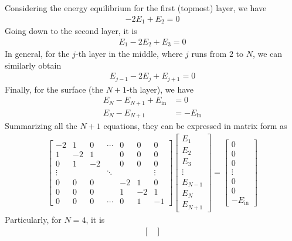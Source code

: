 \begin{solution}
Considering the energy equilibrium for the first (topmost) layer, we have
\begin{align*}
-2E_1 + E_2 = 0 
\end{align*}
Going down to the second layer, it is
\begin{align*}
E_1 - 2E_2 + E_3 = 0
\end{align*}
In general, for the $j$-th layer in the middle, where $j$ runs from $2$ to $N$, we can similarly obtain
\begin{align}
E_{j-1} - 2E_j + E_{j+1} = 0
\end{align}
Finally, for the surface (the $N+1$-th layer), we have
\begin{align*}
E_N - E_{N+1} + E_{\text{in}}  &= 0 \\
E_N - E_{N+1} &= -E_{\text{in}}  
\end{align*}
Summarizing all the $N+1$ equations, they can be expressed in matrix form as
\begin{align*}
\begin{bmatrix}
-2 & 1 & 0 & \cdots & 0 & 0 & 0 \\
1 & -2 & 1 & & 0 & 0 & 0 \\
0 & 1 & -2 & & 0 & 0 & 0 \\
\vdots & & & \ddots & & & \vdots \\
0 & 0 & 0 & & -2 & 1 & 0 \\
0 & 0 & 0 & & 1 & -2 & 1 \\
0 & 0 & 0 & \cdots & 0 & 1 & -1
\end{bmatrix}
\begin{bmatrix}
E_1 \\
E_2 \\
E_3 \\
\vdots \\
E_{N-1} \\
E_N \\
E_{N+1}
\end{bmatrix}
=
\begin{bmatrix}
0 \\
0 \\
0 \\
\vdots \\
0 \\
0 \\
-E_{\text{in}} 
\end{bmatrix}
\end{align*}
Particularly, for $N=4$, it is
\begin{align*}
\begin{bmatrix}

\end{bmatrix}
\end{align*}
\end{solution}
